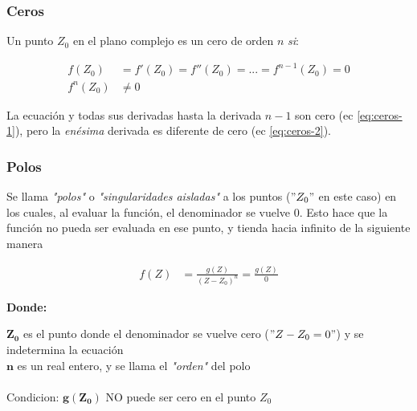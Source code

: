 \subsubsection{Ceros}

Un punto $Z_0$ en el plano complejo es un cero de orden $n$ \textit{si}:

\begin{align}
    f(Z_0) &= f'(Z_0) = f''(Z_0) = ... = f^{n-1}(Z_0) = 0 \label{eq:ceros-1} \\
    f^{n}(Z_0)& \ne 0 \label{eq:ceros-2}
\end{align}

La ecuación y todas sus derivadas hasta la derivada $n-1$ son cero (ec \ref{eq:ceros-1}), pero la \textit{enésima} derivada es diferente de cero (ec \ref{eq:ceros-2}).

\subsubsection{Polos}

Se llama \textit{"polos"} o \textit{"singularidades aisladas"} a los puntos ($"Z_0"$ en este caso) en los cuales, al evaluar la función, el denominador se vuelve $0$. Esto hace que la función no pueda ser evaluada en ese punto, y tienda hacia infinito de la siguiente manera

\begin{align}
    f(Z) &= \frac{g(Z)}{(Z-Z_0)^n} = \frac{g(Z)}{0} \label{eq:polos-1}
\end{align}

\textbf{Donde:}

\begin{addmargin}[2em]{2em}
    $\pmb{Z_0}$ es el punto donde el denominador se vuelve cero ($"Z - Z_0 = 0"$) y se indetermina la ecuación \\
    $\pmb{n}$ es un real entero, y se llama el \textit{"orden"} del polo \\ \\
    Condicion: $\pmb{g(Z_0)}$ NO puede ser cero en el punto $Z_0$
\end{addmargin}


